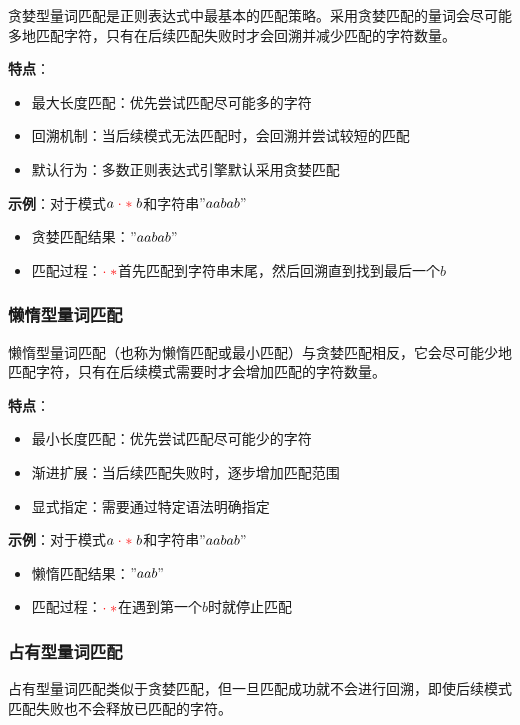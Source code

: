 \documentclass[12pt,a4paper,UTF8]{ctexart}
\newcommand{\func}[1]{\textcolor{red}{#1}}
\begin{document}
\qquad 贪婪型量词匹配是正则表达式中最基本的匹配策略。采用贪婪匹配的量词会尽可能多地匹配字符，只有在后续匹配失败时才会回溯并减少匹配的字符数量。

\textbf{特点}：
\begin{itemize}
    \item 最大长度匹配：优先尝试匹配尽可能多的字符
    \item 回溯机制：当后续模式无法匹配时，会回溯并尝试较短的匹配
    \item 默认行为：多数正则表达式引擎默认采用贪婪匹配
\end{itemize}

\textbf{示例}：对于模式$a\;\func{\cdot\;*}\;b$和字符串$"aabab"$
\begin{itemize}
    \item 贪婪匹配结果：$"aabab"$
    \item 匹配过程：$\func{\cdot\;*}$首先匹配到字符串末尾，然后回溯直到找到最后一个$b$
\end{itemize}

\subsubsection{懒惰型量词匹配}

\qquad 懒惰型量词匹配（也称为懒惰匹配或最小匹配）与贪婪匹配相反，它会尽可能少地匹配字符，只有在后续模式需要时才会增加匹配的字符数量。

\textbf{特点}：
\begin{itemize}
    \item 最小长度匹配：优先尝试匹配尽可能少的字符
    \item 渐进扩展：当后续匹配失败时，逐步增加匹配范围
    \item 显式指定：需要通过特定语法明确指定
\end{itemize}

\textbf{示例}：对于模式$a\;\func{\cdot\;*}\;b$和字符串$"aabab"$
\begin{itemize}
    \item 懒惰匹配结果：$"aab"$
    \item 匹配过程：$\func{\cdot\;*}$在遇到第一个$b$时就停止匹配
\end{itemize}

\subsubsection{占有型量词匹配}

\qquad 占有型量词匹配类似于贪婪匹配，但一旦匹配成功就不会进行回溯，即使后续模式匹配失败也不会释放已匹配的字符。
\end{document}
